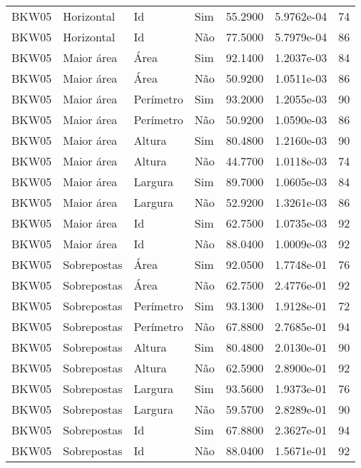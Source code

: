 \begin{tabular}{llllrrr}
    BKW05     & Horizontal  & Id        & Sim         & 55.2900      & 5.9762e-04 & 74       \\
    BKW05     & Horizontal  & Id        & Não         & 77.5000      & 5.7979e-04 & 86       \\
    BKW05     & Maior área  & Área      & Sim         & 92.1400      & 1.2037e-03 & 84       \\
    BKW05     & Maior área  & Área      & Não         & 50.9200      & 1.0511e-03 & 86       \\
    BKW05     & Maior área  & Perímetro & Sim         & 93.2000      & 1.2055e-03 & 90       \\
    BKW05     & Maior área  & Perímetro & Não         & 50.9200      & 1.0590e-03 & 86       \\
    BKW05     & Maior área  & Altura    & Sim         & 80.4800      & 1.2160e-03 & 90       \\
    BKW05     & Maior área  & Altura    & Não         & 44.7700      & 1.0118e-03 & 74       \\
    BKW05     & Maior área  & Largura   & Sim         & 89.7000      & 1.0605e-03 & 84       \\
    BKW05     & Maior área  & Largura   & Não         & 52.9200      & 1.3261e-03 & 86       \\
    BKW05     & Maior área  & Id        & Sim         & 62.7500      & 1.0735e-03 & 92       \\
    BKW05     & Maior área  & Id        & Não         & 88.0400      & 1.0009e-03 & 92       \\
    BKW05     & Sobrepostas & Área      & Sim         & 92.0500      & 1.7748e-01 & 76       \\
    BKW05     & Sobrepostas & Área      & Não         & 62.7500      & 2.4776e-01 & 92       \\
    BKW05     & Sobrepostas & Perímetro & Sim         & 93.1300      & 1.9128e-01 & 72       \\
    BKW05     & Sobrepostas & Perímetro & Não         & 67.8800      & 2.7685e-01 & 94       \\
    BKW05     & Sobrepostas & Altura    & Sim         & 80.4800      & 2.0130e-01 & 90       \\
    BKW05     & Sobrepostas & Altura    & Não         & 62.5900      & 2.8900e-01 & 92       \\
    BKW05     & Sobrepostas & Largura   & Sim         & 93.5600      & 1.9373e-01 & 76       \\
    BKW05     & Sobrepostas & Largura   & Não         & 59.5700      & 2.8289e-01 & 90       \\
    BKW05     & Sobrepostas & Id        & Sim         & 67.8800      & 2.3627e-01 & 94       \\
    BKW05     & Sobrepostas & Id        & Não         & 88.0400      & 1.5671e-01 & 92       \\
    \hline
\end{tabular}